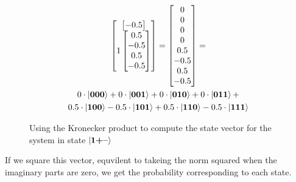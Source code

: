 \begin{figure}[H]
\begin{gather*}
\begin{bmatrix}
\begin{bmatrix}
                -0.5\\
            \end{bmatrix}\\
            1
            \begin{bmatrix}
                0.5\\
                -0.5\\
                0.5\\
                -0.5\\
            \end{bmatrix}\\
        \end{bmatrix}= 
        \begin{bmatrix}
            0\\
            0\\
            0\\
            0\\
            0.5\\
            -0.5\\
            0.5\\
            -0.5\\
        \end{bmatrix}
        =\\
        0\cdot\ket{\mathbf{000}} + 0\cdot\ket{\mathbf{001}}+ 0\cdot\ket{\mathbf{010}}+ 0\cdot\ket{\mathbf{011}}+\\
        0.5\cdot\ket{\mathbf{100}}- 0.5\cdot\ket{\mathbf{101}}+ 0.5\cdot\ket{\mathbf{110}}- 0.5\cdot\ket{\mathbf{111}}
    \end{gather*}
    \caption{Using the Kronecker product to compute the state vector for the system in state $\ket{\mathbf{1}\textbf{+}\textbf{--}}$}
    \label{fig:multi_qubit_state_computation}
\end{figure}
\noindent
If we square this vector, equvilent to takeing the norm squared when the imaginary parts are zero,  we get the probability corresponding to each state.
